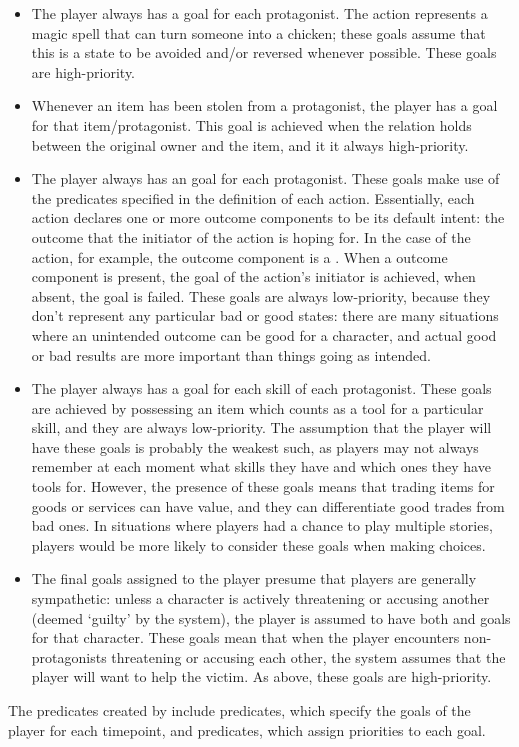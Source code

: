 \begin{enumerate}[leftmargin=1.4em]
\begin{itemize}
\item The player always has a  goal for each protagonist. The  action represents a magic spell that can turn someone into a chicken; these goals assume that this is a state to be avoided and/or reversed whenever possible. These goals are high-priority.
\item Whenever an item has been stolen from a protagonist, the player has a  goal for that item/protagonist. This goal is achieved when the  relation holds between the original owner and the item, and it it always high-priority.
\item The player always has an  goal for each protagonist. These goals make use of the  predicates specified in the definition of each action. Essentially, each action declares one or more outcome components to be its default intent: the outcome that the initiator of the action is hoping for. In the case of the  action, for example, the outcome component  is a . When a  outcome component is present, the  goal of the action's initiator is achieved, when absent, the goal is failed. These goals are always low-priority, because they don't represent any particular bad or good states: there are many situations where an unintended outcome can be good for a character, and actual good or bad results are more important than things going as intended.
\item The player always has a  goal for each skill of each protagonist. These goals are achieved by possessing an item which counts as a tool for a particular skill, and they are always low-priority. The assumption that the player will have these goals is probably the weakest such, as players may not always remember at each moment what skills they have and which ones they have tools for. However, the presence of these goals means that trading items for goods or services can have value, and they can differentiate good trades from bad ones. In situations where players had a chance to play multiple stories, players would be more likely to consider these goals when making choices.
\item The final goals assigned to the player presume that players are generally sympathetic: unless a character is actively threatening or accusing another (deemed `guilty' by the system), the player is assumed to have both  and  goals for that character. These goals mean that when the player encounters non-protagonists threatening or accusing each other, the system assumes that the player will want to help the victim. As above, these goals are high-priority.
\end{itemize}
%
The predicates created by  include  predicates, which specify the goals of the player for each timepoint, and  predicates, which assign priorities to each goal.



\end{enumerate}
